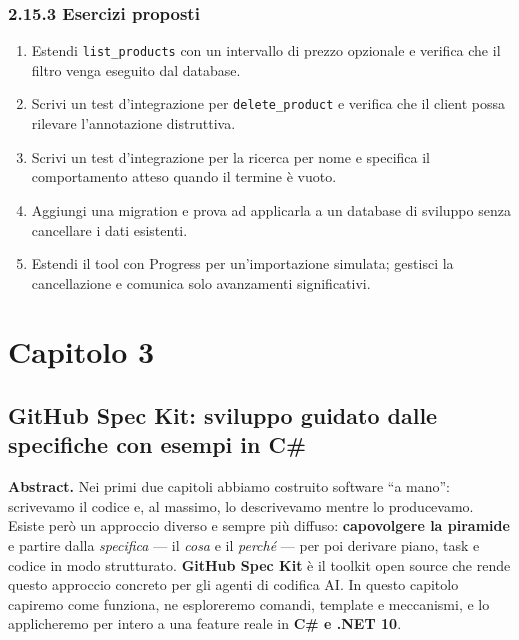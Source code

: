 \documentclass[
  italian,
  10pt,
]{book}
\providecommand{\tightlist}{%
  \setlength{\itemsep}{0pt}\setlength{\parskip}{0pt}}
\begin{document}
\subsection{2.15.3 Esercizi proposti}\label{esercizi-proposti-1}

\begin{enumerate}
\def\labelenumi{\arabic{enumi}.}
\tightlist
\item
  Estendi \texttt{list\_products} con un intervallo di prezzo opzionale
  e verifica che il filtro venga eseguito dal database.
\item
  Scrivi un test d'integrazione per \texttt{delete\_product} e verifica
  che il client possa rilevare l'annotazione distruttiva.
\item
  Scrivi un test d'integrazione per la ricerca per nome e specifica il
  comportamento atteso quando il termine è vuoto.
\item
  Aggiungi una migration e prova ad applicarla a un database di sviluppo
  senza cancellare i dati esistenti.
\item
  Estendi il tool con Progress per un'importazione simulata; gestisci la
  cancellazione e comunica solo avanzamenti significativi.
\end{enumerate}

\chapter{Capitolo 3}\label{capitolo-3}

\section{GitHub Spec Kit: sviluppo guidato dalle specifiche con esempi
in
C\#}\label{github-spec-kit-sviluppo-guidato-dalle-specifiche-con-esempi-in-c}

\textbf{Abstract.} Nei primi due capitoli abbiamo costruito software ``a
mano'': scrivevamo il codice e, al massimo, lo descrivevamo mentre lo
producevamo. Esiste però un approccio diverso e sempre più diffuso:
\textbf{capovolgere la piramide} e partire dalla \emph{specifica} --- il
\emph{cosa} e il \emph{perché} --- per poi derivare piano, task e codice
in modo strutturato. \textbf{GitHub Spec Kit} è il toolkit open source
che rende questo approccio concreto per gli agenti di codifica AI. In
questo capitolo capiremo come funziona, ne esploreremo comandi, template
e meccanismi, e lo applicheremo per intero a una feature reale in
\textbf{C\# e .NET 10}.
\end{document}
